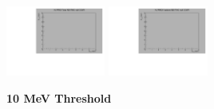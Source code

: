 \begin{center}
  \includegraphics[width=0.245\textwidth]{plots/response_matrix/Total_RHC_CC0Pi_null.pdf}
  \includegraphics[width=0.245\textwidth]{plots/response_matrix/Hadrons_RHC_CC0Pi_null.pdf}

\end{center}

\textbf{10 MeV Threshold}


